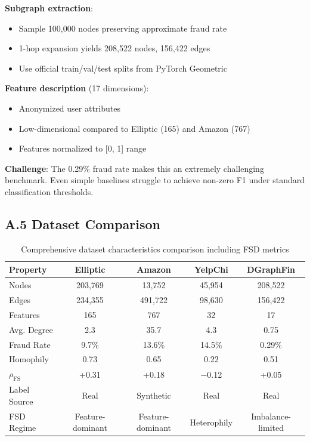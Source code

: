 \textbf{Subgraph extraction}:
\begin{itemize}
\item Sample 100,000 nodes preserving approximate fraud rate
\item 1-hop expansion yields 208,522 nodes, 156,422 edges
\item Use official train/val/test splits from PyTorch Geometric
\end{itemize}

\textbf{Feature description} (17 dimensions):
\begin{itemize}
\item Anonymized user attributes
\item Low-dimensional compared to Elliptic (165) and Amazon (767)
\item Features normalized to [0, 1] range
\end{itemize}

\textbf{Challenge}: The 0.29\% fraud rate makes this an extremely challenging benchmark. Even simple baselines struggle to achieve non-zero F1 under standard classification thresholds.

\subsection*{A.5 Dataset Comparison}

\begin{table}[h]
\centering
\small
\begin{tabular}{lcccc}
\toprule
\textbf{Property} & \textbf{Elliptic} & \textbf{Amazon} & \textbf{YelpChi} & \textbf{DGraphFin} \\
\midrule
Nodes & 203,769 & 13,752 & 45,954 & 208,522 \\
Edges & 234,355 & 491,722 & 98,630 & 156,422 \\
Features & 165 & 767 & 32 & 17 \\
Avg. Degree & 2.3 & 35.7 & 4.3 & 0.75 \\
Fraud Rate & 9.7\% & 13.6\% & 14.5\% & 0.29\% \\
Homophily & 0.73 & 0.65 & 0.22 & 0.51 \\
$\rho_{\text{FS}}$ & +0.31 & +0.18 & $-$0.12 & +0.05 \\
Label Source & Real & Synthetic & Real & Real \\
FSD Regime & Feature-dominant & Feature-dominant & Heterophily & Imbalance-limited \\
\bottomrule
\end{tabular}
\caption{Comprehensive dataset characteristics comparison including FSD metrics}
\end{table}

